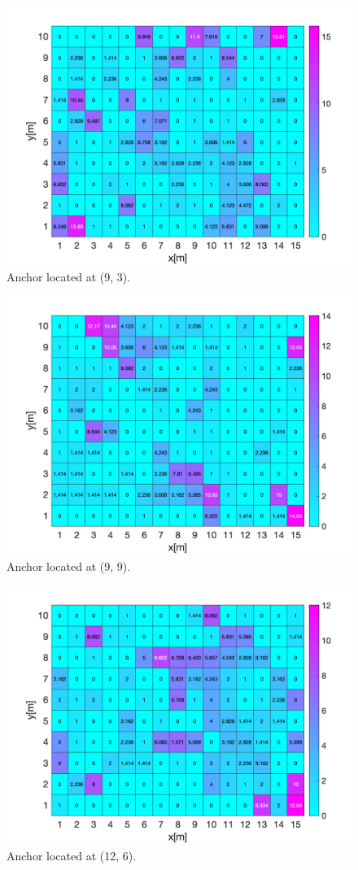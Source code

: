 \begin{figure}[H]
\centering
\includegraphics[width=.9\linewidth]{Images/Anchor_at_(9_3).png}
\caption{Anchor located at (9, 3).}
\end{figure}

\begin{figure}[H]
\centering
\includegraphics[width=.9\linewidth]{Images/Anchor_at_(9_9).png}
\caption{Anchor located at (9, 9).}
\end{figure}

\begin{figure}[H]
\centering
\includegraphics[width=.9\linewidth]{Images/Anchor_at_(12_6).png}
\caption{Anchor located at (12, 6).}
\end{figure}

